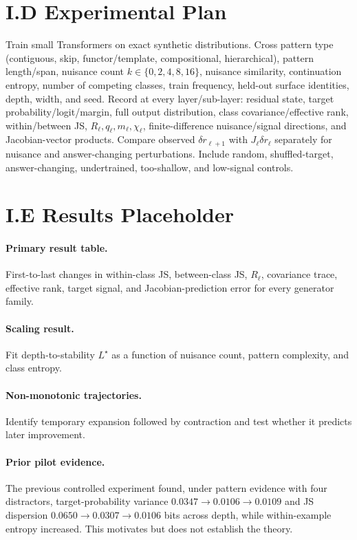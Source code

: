 \documentclass[10pt]{article}
\begin{document}
\section{I.D Experimental Plan}
Train small Transformers on exact synthetic distributions. Cross pattern type (contiguous, skip, functor/template, compositional, hierarchical), pattern length/span, nuisance count $k\in\{0,2,4,8,16\}$, nuisance similarity, continuation entropy, number of competing classes, train frequency, held-out surface identities, depth, width, and seed. Record at every layer/sub-layer: residual state, target probability/logit/margin, full output distribution, class covariance/effective rank, within/between JS, $R_\ell,q_\ell,m_\ell,\chi_\ell$, finite-difference nuisance/signal directions, and Jacobian-vector products. Compare observed $\delta r_{\ell+1}$ with $J_\ell\delta r_\ell$ separately for nuisance and answer-changing perturbations. Include random, shuffled-target, answer-changing, undertrained, too-shallow, and low-signal controls.

\section{I.E Results Placeholder}
\paragraph{Primary result table.} First-to-last changes in within-class JS, between-class JS, $R_\ell$, covariance trace, effective rank, target signal, and Jacobian-prediction error for every generator family.
\paragraph{Scaling result.} Fit depth-to-stability $L^\star$ as a function of nuisance count, pattern complexity, and class entropy.
\paragraph{Non-monotonic trajectories.} Identify temporary expansion followed by contraction and test whether it predicts later improvement.
\paragraph{Prior pilot evidence.} The previous controlled experiment found, under pattern evidence with four distractors, target-probability variance $0.0347\rightarrow0.0106\rightarrow0.0109$ and JS dispersion $0.0650\rightarrow0.0307\rightarrow0.0106$ bits across depth, while within-example entropy increased. This motivates but does not establish the theory.
\end{document}

